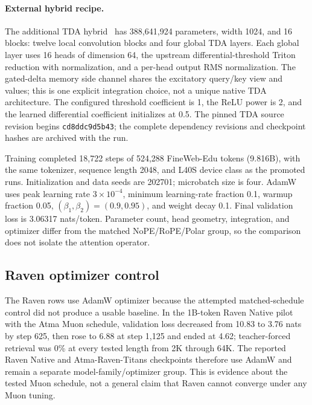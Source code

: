\paragraph{External hybrid recipe.}
The additional TDA hybrid~\citep{huang2026threshold} has 388,641,924 parameters, width 1024, and 16 blocks: twelve local convolution blocks and four global TDA layers. Each global layer uses 16 heads of dimension 64, the upstream differential-threshold Triton reduction with normalization, and a per-head output RMS normalization. The gated-delta memory side channel shares the excitatory query/key view and values; this is one explicit integration choice, not a unique native TDA architecture. The configured threshold coefficient is 1, the ReLU power is 2, and the learned differential coefficient initializes at 0.5. The pinned TDA source revision begins \texttt{cd8ddc9d5b43}; the complete dependency revisions and checkpoint hashes are archived with the run.

Training completed 18,722 steps of 524,288 FineWeb-Edu tokens (9.816B), with the same tokenizer, sequence length 2048, and L40S device class as the promoted runs. Initialization and data seeds are 202701; microbatch size is four. AdamW uses peak learning rate $3\times10^{-4}$, minimum learning-rate fraction 0.1, warmup fraction 0.05, $(\beta_1,\beta_2)=(0.9,0.95)$, and weight decay 0.1. Final validation loss is 3.06317 nats/token. Parameter count, head geometry, integration, and optimizer differ from the matched NoPE/RoPE/Polar group, so the comparison does not isolate the attention operator.

\subsection{Raven optimizer control}
The Raven rows use AdamW optimizer because the attempted matched-schedule control did not produce a usable baseline. In the 1B-token Raven Native pilot with the Atma Muon schedule, validation loss decreased from 10.83 to 3.76 nats by step 625, then rose to 6.88 at step 1,125 and ended at 4.62; teacher-forced retrieval was 0\% at every tested length from 2K through 64K. The reported Raven Native and Atma-Raven-Titans checkpoints therefore use AdamW and remain a separate model-family/optimizer group. This is evidence about the tested Muon schedule, not a general claim that Raven cannot converge under any Muon tuning.

